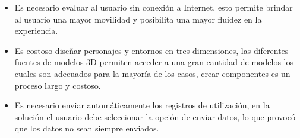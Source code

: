 \begin{itemize}

        

%

\item Es necesario evaluar al usuario sin conexión a Internet, esto  permite brindar 
	al usuario una mayor movilidad y posibilita una mayor fluidez en la experiencia. 

\item Es costoso diseñar personajes y entornos en tres dimensiones, las diferentes
fuentes de modelos 3D permiten
acceder a una gran cantidad de modelos los cuales son adecuados para la
mayoría de los casos, crear componentes es un proceso largo y costoso.

\item Es necesario enviar automáticamente los registros de utilización, en la
    solución el usuario debe seleccionar la opción de enviar datos, lo que
    provocó que los datos no sean siempre enviados.

\end{itemize}


